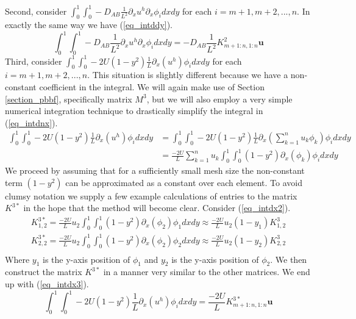 \documentclass[11pt,fleqn]{article}
\theoremstyle{defstyle}
\begin{document}
Second, consider $\int_0^1 \int_0^1  -D_{AB}\frac{1}{L^2}\partial_x u^h \partial_x \phi_i dxdy$ for each $i=m+1, m+2,...,n$. In exactly the same way we have (\ref{eq_intddy}). 
\begin{equation}
\int_0^1 \int_0^1  -D_{AB}\frac{1}{L^2}\partial_x u^h \partial_x \phi_i dxdy = -D_{AB}\frac{1}{L^2}K^2_{m+1:n, 1:n}\mathbf{u}
\label{eq_intddy}
\end{equation}
Third, consider $\int_0^1 \int_0^1 - 2U(1-y^2)\frac{1}{L}\partial_x(u^h)  \phi_idxdy$ for each $i=m+1, m+2,...,n$. This situation is slightly different because we have a non-constant coefficient in the integral. We will again make use of Section \ref{section_pbbf}, specifically matrix $M^3$, but we will also employ a very simple numerical integration technique to drastically simplify the integral in (\ref{eq_intdnx}).
\begin{equation}
\begin{aligned}
\int_0^1 \int_0^1 - 2U(1-y^2)\frac{1}{L}\partial_x(u^h)  \phi_idxdy &= \int_0^1 \int_0^1 - 2U(1-y^2)\frac{1}{L}\partial_x(\sum^n_{k=1} u_k \phi_k)  \phi_idxdy \\
& = \frac{-2U}{L}\sum^n_{k=1} u_k \int_0^1 \int_0^1 (1-y^2) \partial_x(\phi_k)  \phi_idxdy
\end{aligned}
\label{eq_intdnx}
\end{equation}
We proceed by assuming that for a sufficiently small mesh size the non-constant term $(1-y^2)$ can be approximated as a constant over each element. To avoid clumsy notation we supply a few example calculations of entries to the matrix $K^{3*}$ in the hope that the method will become clear. Consider (\ref{eq_intdx2}). 
\begin{equation}
\begin{aligned}
K^{3*}_{1,2} = \frac{-2U}{L} u_2 \int_0^1 \int_0^1 (1-y^2) \partial_x(\phi_2)  \phi_1dxdy \approx \frac{-2U}{L} u_2 (1-y_1)K^3_{1,2} \\
K^{3*}_{2,2} = \frac{-2U}{L} u_2 \int_0^1 \int_0^1 (1-y^2) \partial_x(\phi_2)  \phi_2dxdy \approx \frac{-2U}{L} u_2 (1-y_2)K^3_{2,2} \\ 
\end{aligned}
\label{eq_intdx2}
\end{equation}
Where $y_1$ is the y-axis position of $\phi_1$ and $y_2$ is the y-axis position of $\phi_2$. We then construct the matrix $K^{3*}$ in a manner very similar to the other matrices. We end up with (\ref{eq_intdx3}).
\begin{equation}
\int_0^1 \int_0^1 - 2U\left(1-y^2\right)\frac{1}{L}\partial_x(u^h)  \phi_idxdy  = \frac{-2U}{L} K^{3*}_{m+1:n,1:n}\mathbf{u}
\label{eq_intdx3}
\end{equation}
\end{document}

